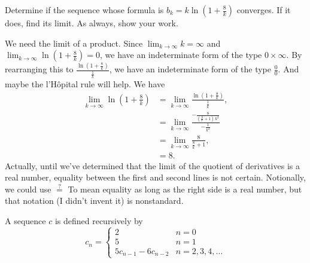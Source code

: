 \documentclass[12pt,fleqn]{exam}
\begin{document}
\begin{questions}
  \newpage
  \question [2] Determine if the sequence whose formula is 
  $b_k = k \ln \left(1+\frac{8}{k} \right)$ converges. If it does, find its 
  limit. As always, show your work.
  \begin{solution}%
We need the limit of a product. Since $\displaystyle \lim_{k \to \infty} k = \infty$ and $\displaystyle \lim_{k \to \infty} \ln \left(1+\frac{8}{k} \right) = 0$, we have an indeterminate form of the type $0 \times \infty$. By rearranging this to $\frac{\ln\left(1+\frac{8}{k} \right) }{\frac{1}{k}}$,
we have an  indeterminate form of the type $\frac{0}{0}$. And maybe the l'Hôpital rule will help.  We have
\begin{align*}
  \lim_{ k  \to \infty} \ln \left(1+\frac{8}{k} \right) &=  \lim_{k \to \infty} \frac{ \ln \left(1+\frac{8}{k} \right) }{\frac{1}{k}}, \\
                                                                                          &= \lim_{k \to \infty} \frac{ -\frac{8}{\left( \frac{8}{k}+1\right) \, {{k}^{2}}}}{-\frac{1}{k^2}}\\
                                                                                          &=  \lim_{k \to \infty} \frac{8}{\frac{8}{k}+1}, \\
                                                                                          &= 8.
\end{align*}
  Actually, until we've determined that the limit of the quotient of derivatives is a real number, equality between the first and second lines is 
  not certain.  Notionally, we could use $\overset{?}{=}$ To mean equality as long as the right side is a real number, but that notation (I didn't invent it) is nonstandard.
  \end{solution}

  \newpage
  \question A sequence $c$ is defined recursively by
  \begin{equation*}
      c_n = \begin{cases} 2 & n=0 \\
                          5 & n=1 \\
                          5 c_{n-1}-6 c_{n-2} & n=2,3,4,\dots
      \end{cases}
    \end{equation*}
        
\end{questions}
\end{document}
